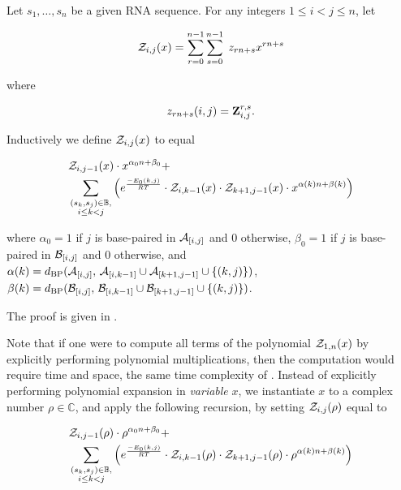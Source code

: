 \begin{theorem}
\label{thm:ffttwo:recursions}
Let $s_1,\dots,s_n$ be a given RNA sequence.
For any integers $1 \leq i < j \leq n$, let

\begin{align}
{\mathcal Z}_{i,j}(x) = \sum_{r=0}^{n-1} \sum_{s=0}^{n-1}\; z_{rn+s} x^{rn+s}
\end{align}

where

\begin{align}
z_{rn+s}(i,j) = {\bf Z}^{r,s}_{i,j}.
\end{align}

Inductively we define ${\mathcal Z}_{i,j}(x)$ to equal

\begin{align}
\label{eq:ffttwo:polyRecNussJac}
\begin{split}
&\emZof{i,j-1}{x} \cdot x^{\alpha_0n+\beta_0} + \\
&\sum_{\substack{(s_k,s_j) \in \bpSet,\\i\le k<j}}
\left(\boltzNuss{k,j}\cdot
\emZof{i,k-1}{x} \cdot \emZof{k+1,j-1}{x}\cdot x^{\alpha(k)n+\beta(k)} \right)
\end{split}
\end{align}

where $\alpha_0 = 1$ if $j$ is base-paired in $\mathcal A_{[i,j]}$ and $0$ otherwise,
$\beta_0 = 1$ if $j$ is base-paired in $\mathcal B_{[i,j]}$ and $0$ otherwise, and
$\alpha(k) =
d_{\text{BP}}(\mathcal A_{[i,j]},\,\mathcal A_{[i,k-1]} \cup \mathcal A_{[k+1,j-1]} \cup \{ (k,j) \})$,
$\beta(k) =
d_{\text{BP}}(\mathcal B_{[i,j]},\,\mathcal B_{[i,k-1]} \cup \mathcal B_{[k+1,j-1]} \cup \{ (k,j) \})$.

The proof is given in .
\end{theorem}

Note that if one were to compute all terms of the polynomial ${\mathcal Z}_{1,n}(x)$
by explicitly performing polynomial multiplications,
then the computation would require  time and  space, the
same time complexity of \rnatwofold \citep{hofacker:RNAbor2D}.
Instead of explicitly performing polynomial expansion in {\em variable} $x$,
we instantiate $x$ to a
complex number $\rho \in \mathbb{C}$, and apply
the following recursion, by setting ${\mathcal Z}_{i,j}(\rho)$ equal to

\begin{align}
\label{eq:ffttwo:polyRecNussJacInit}
\begin{split}
&\emZof{i,j-1}{\rho} \cdot \rho^{\alpha_0n+\beta_0} + \\
&\sum_{\substack{(s_k,s_j) \in \bpSet,\\i\le k<j}}
\left(\boltzNuss{k,j}\cdot
\emZof{i,k-1}{\rho} \cdot \emZof{k+1,j-1}{\rho}
\cdot \rho^{\alpha(k)n+\beta(k)} \right)
\end{split}
\end{align}

